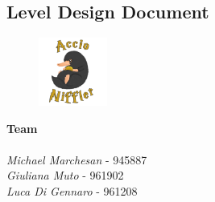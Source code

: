 \begin{titlepage}

\section*{Level Design Document}


\begin{figure}
	\centering
	\includegraphics[max width=0.2\textwidth]{../Pictures/Niffler_logo.png}
\end{figure}

\textbf{Team} \\ \\
\textit{Michael Marchesan} - 945887 \\
\textit{Giuliana Muto} - 961902 \\
\textit{Luca Di Gennaro} - 961208

\end{titlepage}

